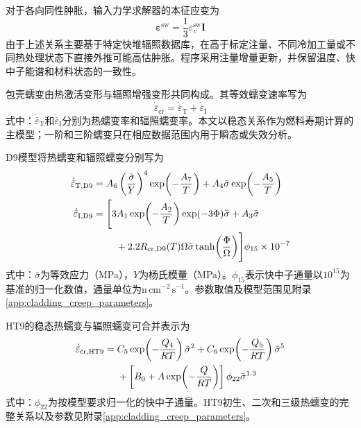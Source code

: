 对于各向同性肿胀，输入力学求解器的本征应变为
\begin{equation}
	\boldsymbol{\varepsilon}^{\mathrm{sw}}
	=\frac{1}{3}\varepsilon_v^{\mathrm{sw}}\boldsymbol I
	\label{eq:clad_isotropic_swelling_eigenstrain}
\end{equation}
由于上述关系主要基于特定快堆辐照数据库，在高于标定注量、不同冷加工量或不同热处理状态下直接外推可能高估肿胀。程序采用注量增量更新，并保留温度、快中子能谱和材料状态的一致性。

\label{sec:cladding_creep}

包壳蠕变由热激活变形与辐照增强变形共同构成。其等效蠕变速率写为
\begin{equation}
	\dot{\bar\varepsilon}_{\mathrm{cr}}
	=\dot{\bar\varepsilon}_{\mathrm T}
	+\dot{\bar\varepsilon}_{\mathrm I}
	\label{eq:clad_total_creep_rate}
\end{equation}
式中：$\dot{\bar\varepsilon}_{\mathrm T}$和$\dot{\bar\varepsilon}_{\mathrm I}$分别为热蠕变率和辐照蠕变率。本文以稳态关系作为燃料寿期计算的主模型；一阶和三阶蠕变只在相应数据范围内用于瞬态或失效分析。

D9模型将热蠕变和辐照蠕变分别写为\cite{hofmanMetallicFuelsHandbook2019,halesBISONTheoryManual2016}
\begin{subequations}\label{eq:d9_creep_rate}
	\begin{align}
		\dot{\bar\varepsilon}_{\mathrm T,\mathrm{D9}}
		={}&A_6\left(\frac{\bar\sigma}{Y}\right)^4
		\exp\!\left(-\frac{A_7}{T}\right)
		+A_4\bar\sigma\exp\!\left(-\frac{A_5}{T}\right)
		\label{eq:d9_thermal_creep_rate}\\
		\dot{\bar\varepsilon}_{\mathrm I,\mathrm{D9}}
		={}&\Biggl[
		3A_1\exp\!\left(-\frac{A_2}{T}\right)
		\exp(-3\Phi)\bar\sigma
		+A_3\bar\sigma
		\notag\\
		&\quad
		+2.2R_{\mathrm{cr,D9}}(T)\Omega\bar\sigma
		\tanh\!\left(\frac{\Phi}{\Omega}\right)
		\Biggr]\phi_{15}\times10^{-7}
		\label{eq:d9_irradiation_creep_rate}
	\end{align}
\end{subequations}
式中：$\bar\sigma$为等效应力（MPa），$Y$为杨氏模量（MPa）。$\phi_{15}$表示快中子通量以$10^{15}$为基准的归一化数值，通量单位为$\mathrm{n\,cm^{-2}\,s^{-1}}$。参数取值及模型范围见附录\ref{app:cladding_creep_parameters}。

HT9的稳态热蠕变与辐照蠕变可合并表示为\cite{hofmanMetallicFuelsHandbook2019,halesBISONTheoryManual2016}
\begin{align}
	\dot{\bar\varepsilon}_{\mathrm{cr,HT9}}
	={}&C_5\exp\!\left(-\frac{Q_4}{RT}\right)\bar\sigma^2
	+C_6\exp\!\left(-\frac{Q_5}{RT}\right)\bar\sigma^5
	\notag\\
	&+\left[
	B_0+A\exp\!\left(-\frac{Q}{RT}\right)
	\right]\phi_{22}\bar\sigma^{1.3}
	\label{eq:ht9_steady_creep_rate}
\end{align}
式中：$\phi_{22}$为按模型要求归一化的快中子通量。HT9初生、二次和三级热蠕变的完整关系以及参数见附录\ref{app:cladding_creep_parameters}。

